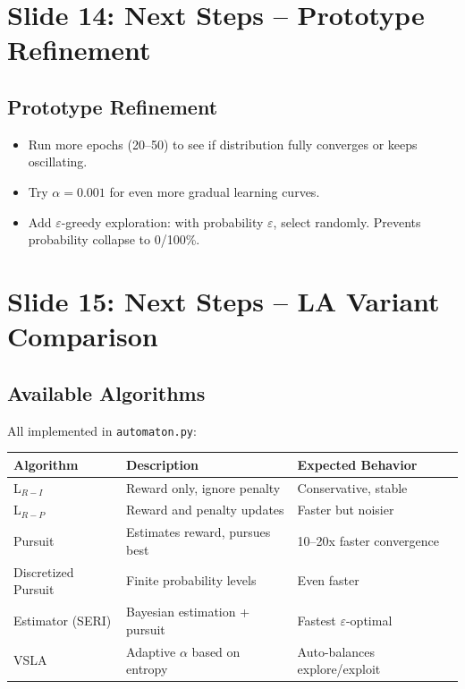 \documentclass[11pt]{article}
\newenvironment{talkingpoints}{%
  \begin{itemize}[leftmargin=1.5em, itemsep=0.3em]
}{%
  \end{itemize}
}
\begin{document}
\section{Slide 14: Next Steps -- Prototype Refinement}

\subsection{Prototype Refinement}

\begin{talkingpoints}
  \item Run more epochs (20--50) to see if distribution fully converges or keeps oscillating.
  \item Try $\alpha = 0.001$ for even more gradual learning curves.
  \item Add $\varepsilon$-greedy exploration: with probability $\varepsilon$, select randomly. Prevents probability collapse to 0/100\%.
\end{talkingpoints}

\section{Slide 15: Next Steps -- LA Variant Comparison}

\subsection{Available Algorithms}

All implemented in \texttt{automaton.py}:

\begin{center}
\small
\begin{tabular}{lll}
\toprule
\textbf{Algorithm} & \textbf{Description} & \textbf{Expected Behavior} \\
\midrule
L$_{R-I}$ & Reward only, ignore penalty & Conservative, stable \\
L$_{R-P}$ & Reward and penalty updates & Faster but noisier \\
Pursuit & Estimates reward, pursues best & 10--20x faster convergence \\
Discretized Pursuit & Finite probability levels & Even faster \\
Estimator (SERI) & Bayesian estimation + pursuit & Fastest $\varepsilon$-optimal \\
VSLA & Adaptive $\alpha$ based on entropy & Auto-balances explore/exploit \\
\bottomrule
\end{tabular}
\end{center}
\end{document}
